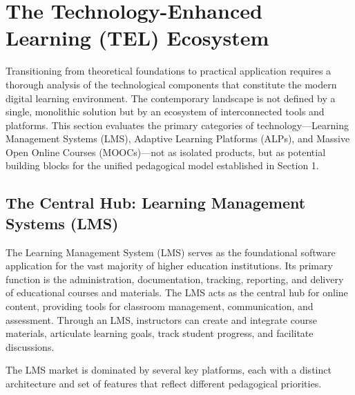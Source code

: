 \documentclass{article}
\begin{document}
\section{The Technology-Enhanced Learning (TEL) Ecosystem}

Transitioning from theoretical foundations to practical application requires a thorough analysis of the technological components that constitute the modern digital learning environment. The contemporary landscape is not defined by a single, monolithic solution but by an ecosystem of interconnected tools and platforms. This section evaluates the primary categories of technology—Learning Management Systems (LMS), Adaptive Learning Platforms (ALPs), and Massive Open Online Courses (MOOCs)—not as isolated products, but as potential building blocks for the unified pedagogical model established in Section 1.

\subsection{The Central Hub: Learning Management Systems (LMS)}

The Learning Management System (LMS) serves as the foundational software application for the vast majority of higher education institutions.\cite{25} Its primary function is the administration, documentation, tracking, reporting, and delivery of educational courses and materials.\cite{25, 26} The LMS acts as the central hub for online content, providing tools for classroom management, communication, and assessment.\cite{25, 27} Through an LMS, instructors can create and integrate course materials, articulate learning goals, track student progress, and facilitate discussions.\cite{25}

The LMS market is dominated by several key platforms, each with a distinct architecture and set of features that reflect different pedagogical priorities.
\end{document}
